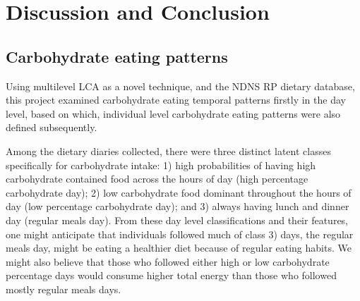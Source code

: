 
\chapter{Discussion and Conclusion} %

\label{Chapter 4} %







\section{Carbohydrate eating patterns}

Using multilevel LCA as a novel technique, and the NDNS RP dietary database, this project examined carbohydrate eating temporal patterns firstly in the day level, based on which, individual level carbohydrate eating patterns were also defined subsequently. 

Among the dietary diaries collected, there were three distinct latent classes specifically for carbohydrate intake: 1) high probabilities of having high carbohydrate contained food across the hours of day (high percentage carbohydrate day); 2) low carbohydrate food dominant throughout the hours of day (low percentage carbohydrate day); and 3) always having lunch and dinner day (regular meals day). From these day level classifications and their features, one might anticipate that individuals followed much of class 3) days, the regular meals day, might be eating a healthier diet because of regular eating habits. We might also believe that those who followed either high or low carbohydrate percentage days would consume higher total energy than those who followed mostly regular meals days. 

